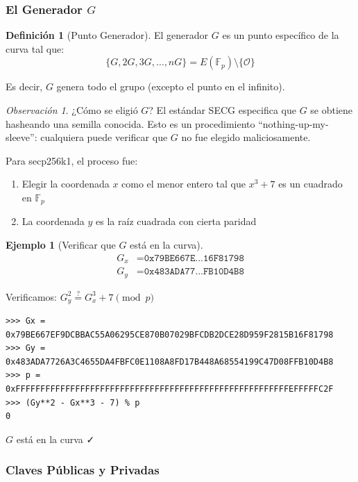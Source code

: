 \documentclass[11pt,a4paper,twoside,openright]{book}
\theoremstyle{definition}
\newtheorem{definition}{Definición}[chapter]
\newtheorem{example}{Ejemplo}[chapter]
\theoremstyle{plain}
\theoremstyle{remark}
\newtheorem{remark}{Observación}[chapter]
\newcommand{\Fp}{\mathbb{F}_p}
\begin{document}
\subsubsection{El Generador $G$}

\begin{definition}[Punto Generador]
El generador $G$ es un punto específico de la curva tal que:
\[ \{G, 2G, 3G, \ldots, nG\} = E(\Fp) \setminus \{\mathcal{O}\} \]

Es decir, $G$ genera todo el grupo (excepto el punto en el infinito).
\end{definition}

\begin{remark}
¿Cómo se eligió $G$? El estándar SECG especifica que $G$ se obtiene hasheando una semilla conocida. Esto es un procedimiento ``nothing-up-my-sleeve'': cualquiera puede verificar que $G$ no fue elegido maliciosamente.

Para secp256k1, el proceso fue:
\begin{enumerate}
    \item Elegir la coordenada $x$ como el menor entero tal que $x^3 + 7$ es un cuadrado en $\Fp$
    \item La coordenada $y$ es la raíz cuadrada con cierta paridad
\end{enumerate}
\end{remark}

\begin{example}[Verificar que $G$ está en la curva]
\begin{align}
G_x &= \texttt{0x79BE667E...16F81798} \\
G_y &= \texttt{0x483ADA77...FB10D4B8}
\end{align}

Verificamos: $G_y^2 \stackrel{?}{=} G_x^3 + 7 \pmod{p}$

\begin{verbatim}
>>> Gx = 0x79BE667EF9DCBBAC55A06295CE870B07029BFCDB2DCE28D959F2815B16F81798
>>> Gy = 0x483ADA7726A3C4655DA4FBFC0E1108A8FD17B448A68554199C47D08FFB10D4B8
>>> p = 0xFFFFFFFFFFFFFFFFFFFFFFFFFFFFFFFFFFFFFFFFFFFFFFFFFFFFFFFEFFFFFC2F
>>> (Gy**2 - Gx**3 - 7) % p
0
\end{verbatim}

$G$ está en la curva ✓
\end{example}

\subsubsection{Claves Públicas y Privadas}
\end{document}
